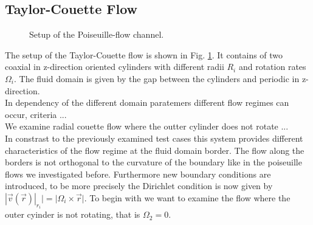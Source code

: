 \subsection{Taylor-Couette Flow}

\begin{figure}[!bp]
  \begin{minipage}[c]{0.6\textwidth}
      \centering
  \end{minipage}
  \begin{minipage}[c]{0.3\textwidth}
      \caption{Setup of the Poiseuille-flow channel.
      \label{validation:setup_tcflow}
      }
  \end{minipage}
\end{figure}

The setup of the Taylor-Couette flow is  shown in Fig. \ref{validation:setup_tcflow}.
It contains of two coaxial in z-direction oriented cylinders
with different radii $R_i$ and rotation rates $\Omega_i$. The fluid domain is given by the gap between the cylinders and
periodic in z-direction.\\
In dependency of the different domain paratemers different flow regimes can occur, criteria ...\\
We examine radial couette flow where the outter cylinder does not rotate ...\\


In constrast to the previously examined test cases this system provides different characteristics
of the flow regime at the fluid domain border. The flow along the borders is not orthogonal to the curvature of
the boundary like in the poiseuille flows we investigated before. Furthermore  new boundary
conditions are introduced, to be more precisely the Dirichlet condition is now given by $|\vec{v}(\vec{r})|_{r_i} | = |\Omega_i \times \vec{r}|$.
To begin with we want to examine the flow where the outer cyinder is not rotating, that is $\Omega_2 = 0$.

